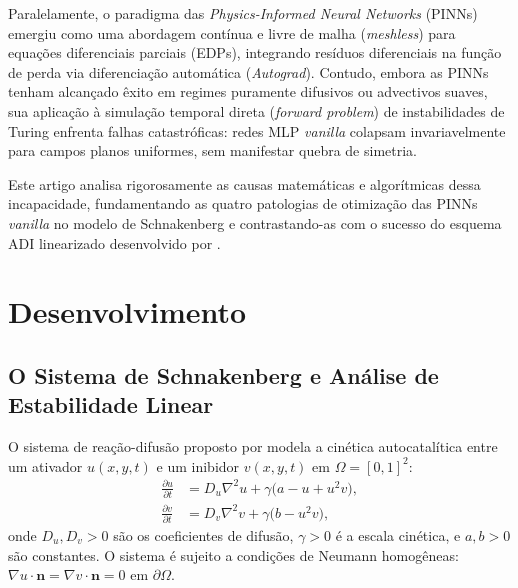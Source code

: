 \documentclass[a4paper, 12pt, twoside]{article}
\begin{document}
Paralelamente, o paradigma das \textit{Physics-Informed Neural Networks} (PINNs)
\cite{raissi2019pinns} emergiu como uma abordagem contínua e livre de malha
(\textit{meshless}) para equações diferenciais parciais (EDPs), integrando resíduos
diferenciais na função de perda via diferenciação automática (\textit{Autograd}). Contudo,
embora as PINNs tenham alcançado êxito em regimes puramente difusivos ou advectivos
suaves, sua aplicação à simulação temporal direta (\textit{forward problem}) de
instabilidades de Turing enfrenta falhas catastróficas: redes MLP \textit{vanilla} colapsam
invariavelmente para campos planos uniformes, sem manifestar quebra de simetria.

Este artigo analisa rigorosamente as causas matemáticas e algorítmicas dessa incapacidade,
fundamentando as quatro patologias de otimização das PINNs \textit{vanilla} no modelo de
Schnakenberg \cite{schnakenberg1979simple} e contrastando-as com o sucesso do esquema ADI
linearizado desenvolvido por \textcite{pereira2019}.


\section{Desenvolvimento}

\subsection{O Sistema de Schnakenberg e Análise de Estabilidade Linear}

O sistema de reação-difusão proposto por \textcite{schnakenberg1979simple} modela a cinética
autocatalítica entre um ativador $u(x,y,t)$ e um inibidor $v(x,y,t)$ em $\Omega = [0,1]^2$:
\begin{align}
  \frac{\partial u}{\partial t} &= D_u \nabla^2 u + \gamma \bigl(a - u + u^2 v\bigr), \label{eq:schnak_u}\\[-2pt]
  \frac{\partial v}{\partial t} &= D_v \nabla^2 v + \gamma \bigl(b - u^2 v\bigr), \label{eq:schnak_v}
\end{align}
onde $D_u, D_v > 0$ são os coeficientes de difusão, $\gamma > 0$ é a escala cinética, e
$a, b > 0$ são constantes. O sistema é sujeito a condições de Neumann homogêneas:
$\nabla u \cdot \mathbf{n} = \nabla v \cdot \mathbf{n} = 0$ em $\partial\Omega$.
\end{document}
